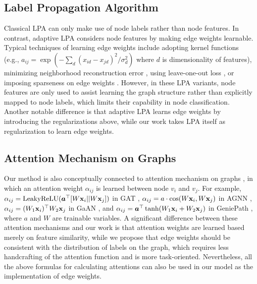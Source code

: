 \documentclass{article}
\begin{document}
	\subsection{Label Propagation Algorithm}
		Classical LPA \citep{zhu2005semi,zhou2004learning} can only make use of node labels rather than node features.
		In contrast, adaptive LPA considers node features by making edge weights learnable.
		Typical techniques of learning edge weights include adopting kernel functions \citep{zhu2003semi,liu2018learning} (e.g., $a_{ij} = \exp ( -\sum_d (x_{id} - x_{jd})^2 / \sigma^2_d )$ where $d$ is dimensionality of features), minimizing neighborhood reconstruction error \citep{wang2008label,karasuyama2013manifold}, using leave-one-out loss \citep{zhang2007hyperparameter}, or imposing sparseness on edge weights \citep{hong2009sparsity}.
		However, in these LPA variants, node features are only used to assist learning the graph structure rather than explicitly mapped to node labels, which limits their capability in node classification.
		Another notable difference is that adaptive LPA learns edge weights by introducing the regularizations above, while our work takes LPA itself as regularization to learn edge weights.
	
	\subsection{Attention Mechanism on Graphs}
	Our method is also conceptually connected to attention mechanism on graphs \citep{velivckovic2018graph,thekumparampil2018attention,zhang2018gaan,liu2019geniepath}, in which an attention weight $\alpha_{ij}$ is learned between node $v_i$ and $v_j$.
	For example, $\alpha_{ij} = \text{LeakyReLU}({\bm a}^\top [W{\bf x}_i || W{\bf x}_j])$ in GAT \citep{velivckovic2018graph}, $\alpha_{ij} = a \cdot \cos(W {\bf x}_i, W {\bf x}_j)$ in AGNN \citep{thekumparampil2018attention}, $\alpha_{ij} = (W_1 {\bf x}_i)^\top W_2 {\bf x}_j$ in GaAN \citep{zhang2018gaan}, and $\alpha_{ij} = {\bm a}^\top \tanh(W_1 {\bf x}_i + W_2 {\bf x}_j)$ in GeniePath \citep{liu2019geniepath}, where $a$ and $W$ are trainable variables.
	A significant difference between these attention mechanisms and our work is that attention weights are learned based merely on feature similarity, while we propose that edge weights should be consistent with the distribution of labels on the graph, which requires less handcrafting of the attention function and is more task-oriented.
	Nevertheless, all the above formulas for calculating attentions can also be used in our model as the implementation of edge weights.
	
\end{document}
